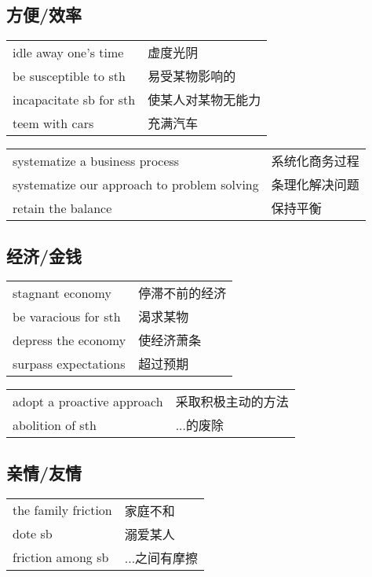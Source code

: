 \subsection{方便/效率}

\begin{tabular}{ll}
    idle away one's time    & 虚度光阴      \\
    be susceptible to sth   & 易受某物影响的   \\
    incapacitate sb for sth & 使某人对某物无能力 \\
    teem with cars          & 充满汽车      \\
\end{tabular}

\begin{tabular}{ll}
    systematize a business process              & 系统化商务过程 \\
    systematize our approach to problem solving & 条理化解决问题 \\
    retain the balance                          & 保持平衡    \\
\end{tabular}

\subsection{经济/金钱}

\begin{tabular}{ll}
    stagnant economy     & 停滞不前的经济 \\
    be varacious for sth & 渴求某物    \\
    depress the economy  & 使经济萧条   \\
    surpass expectations & 超过预期    \\
\end{tabular}

\begin{tabular}{ll}
    adopt a proactive approach & 采取积极主动的方法 \\
    abolition of sth           & ...的废除    \\
\end{tabular}

\subsection{亲情/友情}

\begin{tabular}{ll}
    the family friction & 家庭不和     \\
    dote sb             & 溺爱某人     \\
    friction among sb   & ...之间有摩擦 \\
\end{tabular}

